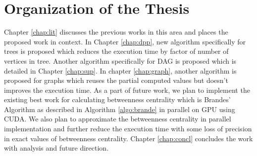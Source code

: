 \vspace{-1.0em}
\section{Organization of the Thesis}
\vspace{-1.0em}
Chapter \ref{chap:lit} discusses the previous works in this area and places the proposed work in context. In Chapter \ref{chap:dpp}, new algorithm specifically for trees is proposed which reduces the execution time by factor of number of vertices in tree. Another algorithm specifically for DAG is proposed which is detailed in Chapter \ref{chap:sup}. In chapter \ref{chap:graph}, another algorithm is proposed for graphs which reuses the partial computed values but doesn't improves the execution time. As a part of future work, we plan to implement the existing best work for calculating betweenness centrality which is Brandes' Algorithm as described in Algorithm \ref{algo:brande} in parallel on GPU using CUDA. We also plan to approximate the betweenness centrality in parallel implementation and further reduce the execution time with some loss of precision in exact values of betweenness centrality. Chapter \ref{chap:concl} concludes the work with analysis and future direction.